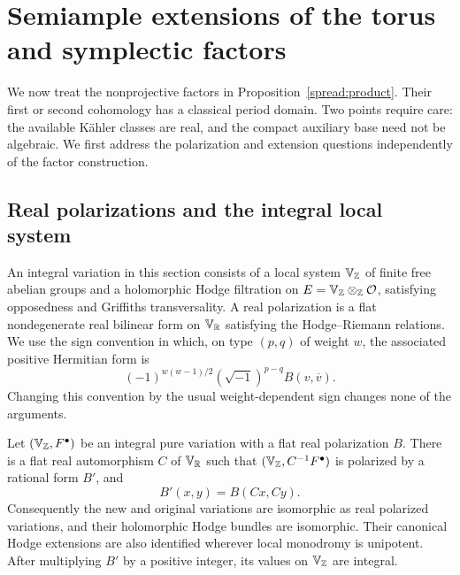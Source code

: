 \section{Semiample extensions of the torus and symplectic factors}
\label{periods:section}

We now treat the nonprojective factors in Proposition~\ref{spread:product}.
Their first or second cohomology has a classical period domain.  Two points
require care: the available K\"ahler classes are real, and the compact auxiliary
base need not be algebraic.  We first address the polarization and extension
questions independently of the factor construction.

\subsection{Real polarizations and the integral local system}

An integral variation in this section consists of a local system
$\mathbb V_{\mathbb Z}$ of finite free abelian groups and a holomorphic Hodge filtration
on $E=\mathbb V_{\mathbb Z}\otimes_{\mathbb Z}\mathcal O$, satisfying opposedness and Griffiths
transversality.  A real polarization is a flat nondegenerate real bilinear
form on $\mathbb V_{\mathbb R}$ satisfying the Hodge--Riemann relations.  We use the
sign convention in which, on type $(p,q)$ of weight $w$, the associated
positive Hermitian form is
\begin{equation}\label{periods:sign}
 (-1)^{w(w-1)/2}(\sqrt{-1})^{p-q}B(v,\overline v).
\end{equation}
Changing this convention by the usual weight-dependent sign changes none of
the arguments.

\begin{lemma}\label{periods:rationalization}
Let $(\mathbb V_{\mathbb Z},F^\bullet)$ be an integral pure variation with a flat real
polarization $B$.  There is a flat real automorphism $C$ of $\mathbb V_{\mathbb R}$
such that $(\mathbb V_{\mathbb Z},C^{-1}F^\bullet)$ is polarized by a rational form
$B'$, and
\[
 B'(x,y)=B(Cx,Cy).
\]
Consequently the new and original variations are isomorphic as real
polarized variations, and their holomorphic Hodge bundles are isomorphic.
Their canonical Hodge extensions are also identified wherever local
monodromy is unipotent.  After multiplying $B'$ by a positive integer, its
values on $\mathbb V_{\mathbb Z}$ are integral.
\end{lemma}

